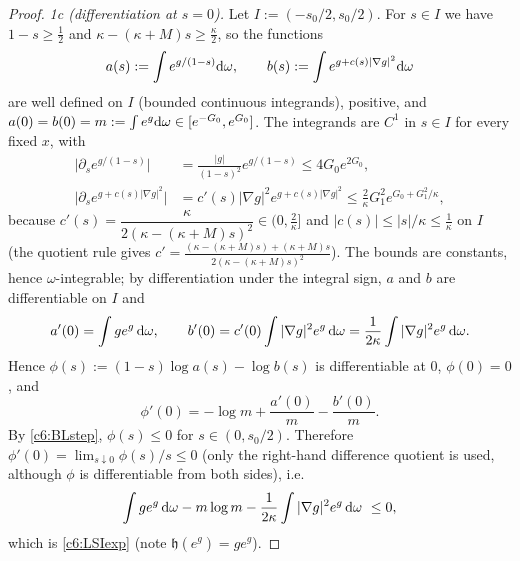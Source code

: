 \begin{proof}
\emph{1c (differentiation at $s=0$).} Let $I:=(-s_0/2,s_0/2)$. For $s\in I$ we have $1-s\ge\frac12$ and $\kappa-(\kappa+M)s\ge\frac\kappa2$, so the functions
\[a(s):=\int e^{g/(1-s)}\mathrm{d}\omega,\qquad b(s):=\int e^{g+c(s)|\nabla g|^2}\mathrm{d}\omega\]
are well defined on $I$ (bounded continuous integrands), positive, and $a(0)=b(0)=m:=\int e^g\mathrm{d}\omega\in[e^{-G_0},e^{G_0}]$.
The integrands are $C^1$ in $s\in I$ for every fixed $x$, with
\begin{align*}
\Big|\partial_se^{g/(1-s)}\Big|&=\frac{|g|}{(1-s)^2}e^{g/(1-s)}\le4G_0e^{2G_0},\\
\Big|\partial_se^{g+c(s)|\nabla g|^2}\Big|&=c'(s)|\nabla g|^2e^{g+c(s)|\nabla g|^2}\le\frac2\kappa G_1^2e^{G_0+G_1^2/\kappa},
\end{align*}
because $c'(s)=\dfrac{\kappa}{2(\kappa-(\kappa+M)s)^2}\in(0,\frac2\kappa]$ and $|c(s)|\le|s|/\kappa\le\frac1\kappa$ on $I$ (the quotient rule gives $c'=\frac{(\kappa-(\kappa+M)s)+(\kappa+M)s}{2(\kappa-(\kappa+M)s)^2}$).
The bounds are constants, hence $\omega$-integrable; by differentiation under the integral sign, $a$ and $b$ are differentiable on $I$ and
\[a'(0)=\int ge^g\,\mathrm{d}\omega,\qquad b'(0)=c'(0)\int|\nabla g|^2e^g\,\mathrm{d}\omega=\frac1{2\kappa}\int|\nabla g|^2e^g\,\mathrm{d}\omega .\]
Hence $\phi(s):=(1-s)\log a(s)-\log b(s)$ is differentiable at $0$, $\phi(0)=0$, and
\[\phi'(0)=-\log m+\frac{a'(0)}{m}-\frac{b'(0)}{m}.\]
By \eqref{c6:BLstep}, $\phi(s)\le0$ for $s\in(0,s_0/2)$. Therefore $\phi'(0)=\lim_{s\downarrow0}\phi(s)/s\le0$
(only the right-hand difference quotient is used, although $\phi$ is differentiable from both sides), i.e.
\[\int ge^g\,\mathrm{d}\omega-m\log m-\frac1{2\kappa}\int|\nabla g|^2e^g\,\mathrm{d}\omega\ \le0,\]
which is \eqref{c6:LSIexp} (note $\mathfrak h(e^g)=ge^g$).


\end{proof}

